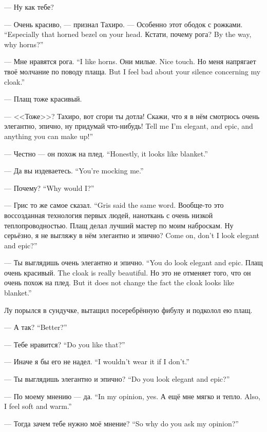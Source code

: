 --- Ну как тебе?

--- Очень красиво, --- признал Тахиро.
{--- Особенно этот ободок с рожками.}
{``Especially that horned bezel on your head.}
{Кстати, почему рога?}
{By the way, why horns?''}

{--- Мне нравятся рога.}
{``I like horns.}
{Они милые.}
{Nice touch.}
{Но меня напрягает твоё молчание по поводу плаща.}
{But I feel bad about your silence concerning my cloak.''}

--- Плащ тоже красивый.

--- <<Тоже>>?
Тахиро, вот сгори ты дотла!
{Скажи, что я в нём смотрюсь очень элегантно, эпично, ну придумай что-нибудь!}
{Tell me I'm elegant, and epic, and anything you can make up!''}

{--- Честно --- он похож на плед.}
{``Honestly, it looks like blanket.''}

{--- Да вы издеваетесь.}
{``You're mocking me.''}

{--- Почему?}
{``Why would I?''}

{--- Грис то же самое сказал.}
{``Gris said the same word.}
Вообще-то это воссозданная технология первых людей, наноткань с очень низкой теплопроводностью.
Плащ делал лучший мастер по моим наброскам.
{Ну серьёзно, я не выгляжу в нём элегантно и эпично?}
{Come on, don't I look elegant and epic?''}

{--- Ты выглядишь очень элегантно и эпично.}
{``You do look elegant and epic.}
{Плащ очень красивый.}
{The cloak is really beautiful.}
{Но это не отменяет того, что он очень похож на плед.}
{But it does not change the fact the cloak looks like blanket.''}

Лу порылся в сундучке, вытащил посеребрённую фибулу и подколол ею плащ.

{--- А так?}
{``Better?''}

{--- Тебе нравится?}
{``Do you like that?''}

{--- Иначе я бы его не надел.}
{``I wouldn't wear it if I don't.''}

{--- Ты выглядишь элегантно и эпично?}
{``Do you look elegant and epic?''}

{--- По моему мнению --- да.}
{``In my opinion, yes.}
{А ещё мне мягко и тепло.}
{Also, I feel soft and warm.''}

{--- Тогда зачем тебе нужно моё мнение?}
{``So why do you ask my opinion?''}

